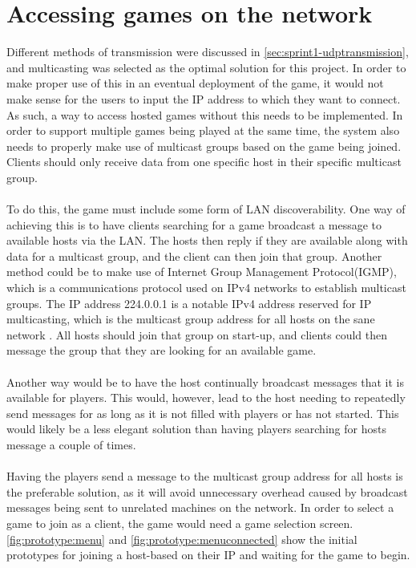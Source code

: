 \section{Accessing games on the network}
Different methods of transmission were discussed in \autoref{sec:sprint1-udptransmission}, and multicasting was selected as the optimal solution for this project.
In order to make proper use of this in an eventual deployment of the game, it would not make sense for the users to input the IP address to which they want to connect.
As such, a way to access hosted games without this needs to be implemented.
In order to support multiple games being played at the same time, the system also needs to properly make use of multicast groups based on the game being joined.
Clients should only receive data from one specific host in their specific multicast group.
\\\\
To do this, the game must include some form of LAN discoverability.
One way of achieving this is to have clients searching for a game broadcast a message to available hosts via the LAN.
The hosts then reply if they are available along with data for a multicast group, and the client can then join that group.
Another method could be to make use of Internet Group Management Protocol(IGMP), which is a communications protocol used on IPv4 networks to establish multicast groups.
The IP address 224.0.0.1 is a notable IPv4 address reserved for IP multicasting, which is the multicast group address for all hosts on the sane network \cite{ipv4multicastaddresses}.
All hosts should join that group on start-up, and clients could then message the group that they are looking for an available game.
\\\\
Another way would be to have the host continually broadcast messages that it is available for players.
This would, however, lead to the host needing to repeatedly send messages for as long as it is not filled with players or has not started.
This would likely be a less elegant solution than having players searching for hosts message a couple of times.
\\\\
Having the players send a message to the multicast group address for all hosts is the preferable solution, as it will avoid unnecessary overhead caused by broadcast messages being sent to unrelated machines on the network.
In order to select a game to join as a client, the game would need a game selection screen.
\autoref{fig:prototype:menu} and \autoref{fig:prototype:menuconnected} show the initial prototypes for joining a host-based on their IP and waiting for the game to begin.
